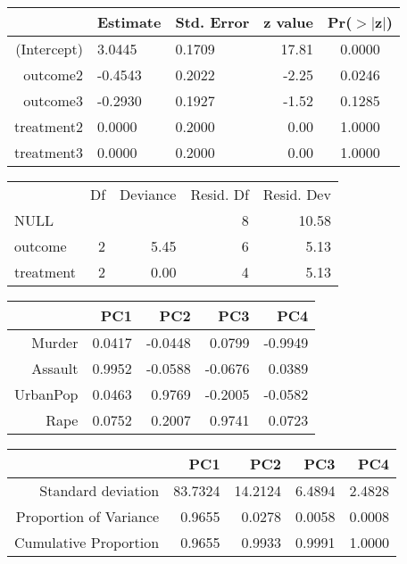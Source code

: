 \begin{table}[ht]
\centering
\begin{tabular}{|r||llrc|}
  \hline
 & Estimate & Std. Error & z value & Pr($>$$|$z$|$) \\ 
  \hline
(Intercept) & 3.0445 & 0.1709 & 17.81 & 0.0000 \\ 
  outcome2 & -0.4543 & 0.2022 & -2.25 & 0.0246 \\ 
  outcome3 & -0.2930 & 0.1927 & -1.52 & 0.1285 \\ 
  treatment2 & 0.0000 & 0.2000 & 0.00 & 1.0000 \\ 
  treatment3 & 0.0000 & 0.2000 & 0.00 & 1.0000 \\ 
   \hline
\end{tabular}
\end{table}
\begin{table}[ht]
\centering
\begingroup\small
\begin{tabular}{lrrrr}
  & Df & Deviance & Resid. Df & Resid. Dev \\ 
 NULL &  &  & 8 & 10.58 \\ 
   \hline
outcome & 2 & 5.45 & 6 & 5.13 \\ 
  treatment & 2 & 0.00 & 4 & 5.13 \\ 
  \end{tabular}
\endgroup
\end{table}
\begin{table}[ht]
\centering
\begin{tabular}{rrrrr}
  \hline
 & PC1 & PC2 & PC3 & PC4 \\ 
  \hline
Murder & 0.0417 & -0.0448 & 0.0799 & -0.9949 \\ 
  Assault & 0.9952 & -0.0588 & -0.0676 & 0.0389 \\ 
  UrbanPop & 0.0463 & 0.9769 & -0.2005 & -0.0582 \\ 
  Rape & 0.0752 & 0.2007 & 0.9741 & 0.0723 \\ 
   \hline
\end{tabular}
\end{table}
\begin{table}[ht]
\centering
\begin{tabular}{rrrrr}
  \hline
 & PC1 & PC2 & PC3 & PC4 \\ 
  \hline
Standard deviation & 83.7324 & 14.2124 & 6.4894 & 2.4828 \\ 
  Proportion of Variance & 0.9655 & 0.0278 & 0.0058 & 0.0008 \\ 
  Cumulative Proportion & 0.9655 & 0.9933 & 0.9991 & 1.0000 \\ 
   \hline
\end{tabular}
\end{table}
